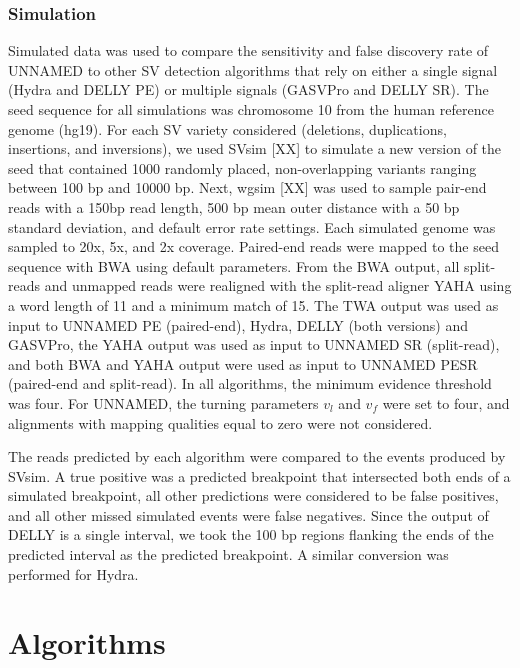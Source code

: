 \documentclass[11pt]{article}
\begin{document}
\subsubsection{Simulation}

Simulated data was used to compare the sensitivity and false discovery rate of
UNNAMED to other SV detection algorithms that rely on either a single signal
(Hydra and DELLY PE) or multiple signals (GASVPro and DELLY SR).  The seed
sequence for all simulations was chromosome 10 from the human reference genome
(hg19).  For each SV variety considered (deletions, duplications, insertions,
and inversions), we used SVsim [XX] to simulate a new version of the seed that
contained 1000 randomly placed, non-overlapping variants ranging between 100 bp
and 10000 bp. Next, wgsim [XX] was used to sample pair-end reads with a 150bp
read length, 500 bp mean outer distance with a 50 bp standard deviation, and
default error rate settings.  Each simulated genome was sampled to 20x, 5x, and
2x coverage. Paired-end reads were mapped to the seed sequence with BWA using
default parameters.  From the BWA output, all split-reads and unmapped reads
were realigned with the split-read aligner YAHA using a word length of 11 and a
minimum match of 15. The TWA output was used as input to UNNAMED PE
(paired-end), Hydra, DELLY (both versions) and GASVPro, the YAHA output was used
as input to UNNAMED SR (split-read), and both BWA and YAHA output were used as
input to UNNAMED PESR (paired-end and split-read).  In all algorithms, the
minimum evidence threshold was four.  For UNNAMED, the turning parameters $v_l$
and $v_f$ were set to four, and alignments with mapping qualities equal to zero
were not considered.

The reads predicted by each algorithm were compared to the events produced by
SVsim.  A true positive was a predicted breakpoint that intersected both ends of
a simulated breakpoint, all other predictions were considered to be false
positives, and all other missed simulated events were false negatives.  Since
the output of DELLY is a single interval, we took the 100 bp regions flanking
the ends of the predicted interval as the predicted breakpoint.  A similar
conversion was performed for Hydra.





\appendix
\section{Algorithms}
\end{document}
